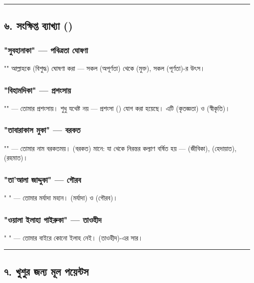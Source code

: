 \medskip\hrule\medskip

\subsection*{৬. সংক্ষিপ্ত ব্যাখ্যা ()}

\subsubsection*{\textbf{"সুবহানাকা" — পবিত্রতা ঘোষণা}}
"" আল্লাহকে  (বিশুদ্ধ) ঘোষণা করা — সকল  (অপূর্ণতা) থেকে  (মুক্ত), সকল  (পূর্ণতা)-র উৎস।

\subsubsection*{\textbf{"বিহামদিকা" — প্রশংসায়}}
"" — তোমার প্রশংসায়। শুধু  যথেষ্ট নয় — প্রশংসা () যোগ করা হয়েছে। এটি  (কৃতজ্ঞতা) ও  (স্বীকৃতি)।

\subsubsection*{\textbf{"তাবারাকাস মুকা" — বরকত}}
"" — তোমার নাম বরকতময়।  (বরকত) মানে: যা থেকে নিরন্তর কল্যাণ বর্ষিত হয় —  (জীবিকা),  (হেদায়াত),  (রহমাত)।

\subsubsection*{\textbf{"তা'আলা জাদ্দুকা" — গৌরব}}
" " — তোমার মর্যাদা মহান।  (মর্যাদা) ও  (গৌরব)।

\subsubsection*{\textbf{"ওয়ালা ইলাহা গাইরুকা" — তাওহীদ}}
"  " — তোমার বাইরে কোনো ইলাহ নেই।  (তাওহীদ)-এর সার।

\medskip\hrule\medskip

\subsection*{৭. খুশুর জন্য মূল পয়েন্টস}

